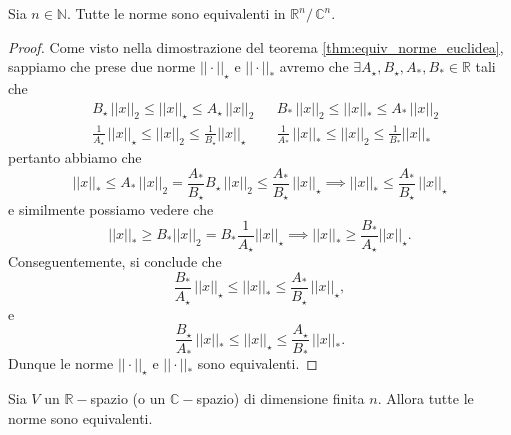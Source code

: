 \begin{cor}
    Sia $n \in \mathbb{N}$. Tutte le norme sono equivalenti in $\mathbb{R}^n / \, \mathbb{C}^n$.
\end{cor}
\begin{proof}
    Come visto nella dimostrazione del teorema \ref{thm:equiv_norme_euclidea}, sappiamo che prese due norme $||\cdot||_{\star}$ e $||\cdot||_{\ast}$ avremo che $\exists A_{\star}, B_{\star}, A_{\ast}, B_{\ast} \in \mathbb{R}$ tali che
    \begin{align*}
        &B_{\star} \, ||x||_2 \leq ||x||_{\star} \leq A_{\star} \, ||x||_2 & &B_{\ast} \, ||x||_2 \leq ||x||_{\ast} \leq A_{\ast} \, ||x||_2 \\
        &\frac{1}{A_{\star}} \, ||x||_{\star} \leq ||x||_{2} \leq \frac{1}{B_{\star}} ||x||_{\star} & &\frac{1}{A_{\ast}} \, ||x||_{\ast} \leq ||x||_{2} \leq \frac{1}{B_{\ast}} ||x||_{\ast}
    \end{align*}
    pertanto abbiamo che
    $$
    ||x||_{\ast} \leq  A_{\ast} \, ||x||_2 = \frac{A_{\ast}}{B_{\star}} B_{\star} \, ||x||_2 \leq \frac{A_{\ast}}{B_{\star}} \, ||x||_{\star} \implies ||x||_{\ast} \leq \frac{A_{\ast}}{B_{\star}} \, ||x||_{\star}
    $$
    e similmente possiamo vedere che
    $$
    ||x||_{\ast} \geq B_{\ast} ||x||_2 = B_{\ast} \frac{1}{A_{\star}} ||x||_{\star} \implies ||x||_{\ast} \geq \frac{B_{\ast}}{A_{\star}} ||x||_{\star}.
    $$
    Conseguentemente, si conclude che
    $$
    \frac{B_{\ast}}{A_{\star}} \, ||x||_{\star} \leq ||x||_{\ast} \leq \frac{A_{\ast}}{B_{\star}} \, ||x||_{\star},
    $$
    e
    $$
    \frac{B_{\star}}{A_{\ast}} \, ||x||_{\ast} \leq ||x||_{\star} \leq \frac{A_{\star}}{B_{\ast}} \, ||x||_{\ast}.
    $$
    Dunque le norme $||\cdot||_{\star}$ e $||\cdot||_{\ast}$ sono equivalenti.
\end{proof}
\begin{cor}
    Sia $V$ un $\mathbb{R}-$spazio (o un $\mathbb{C}-$spazio) di dimensione finita $n$. Allora tutte le norme sono equivalenti. 
    \label{cor:equivalence_norms}
\end{cor}
